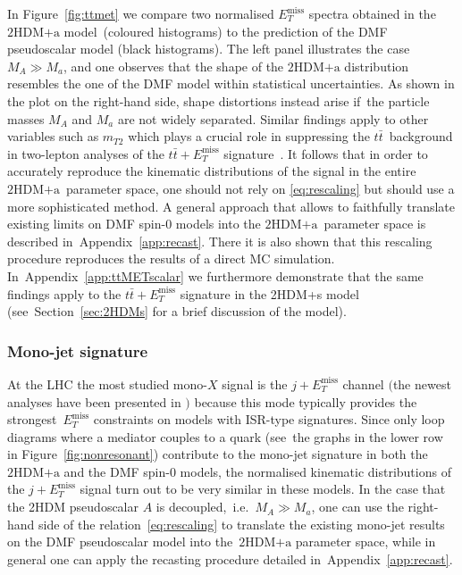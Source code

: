 \documentclass[a4paper, 11pt,notoc]{article}
\newcommand{\MET}{\ensuremath{E_T^\mathrm{miss}}\xspace}
\newcommand{\mA}{\ensuremath{M_{A}}\xspace}
\newcommand{\ma}{\ensuremath{M_{a}}\xspace}
\newcommand{\hdma}{\ensuremath{\textrm{2HDM+a}}\xspace}
\begin{document}
In Figure~\ref{fig:ttmet} we compare two normalised $\MET$ spectra obtained in the \hdma model~(coloured histograms) to the prediction of the DMF pseudoscalar   model (black histograms).  The left panel illustrates the case~$M_A \gg M_a$, and one observes that the shape of the \hdma distribution resembles  the one of the DMF model within statistical uncertainties. As shown in the plot on the right-hand side, shape distortions instead arise if~the particle masses $M_A$ and $M_a$ are not widely separated.  Similar findings apply to other variables such as $m_{T2}$ which  plays a crucial role in suppressing the $t \bar t$~background in two-lepton analyses of the $t \bar t + \MET$ signature~\cite{Aaboud:2017rzf,Haisch:2016gry,CMS-PAS-EXO-17-014}. It follows that in order to accurately reproduce the kinematic distributions of the signal in the entire \hdma~parameter space, one should not rely on \eqref{eq:rescaling} but should use a more sophisticated method. A general approach  that allows to faithfully translate existing limits on DMF spin-0   models into the \hdma~parameter space  is described in~Appendix~\ref{app:recast}. There it is also shown that this rescaling procedure reproduces the results of a direct MC simulation.  In~Appendix~\ref{app:ttMETscalar} we furthermore demonstrate that the same findings apply to the $t \bar t + \MET$ signature in the 2HDM+s model  (see~Section~\ref{sec:2HDMs} for a brief discussion of the model).

\subsubsection{Mono-jet signature}

At the LHC the most studied mono-$X$ signal is the $j +\MET$ channel $\big($the newest analyses have been presented in \cite{Aaboud:2017phn,Sirunyan:2017jix}$\big)$ because this mode typically provides the strongest~$\MET$ constraints on models with ISR-type  signatures. Since only loop diagrams where a mediator couples to a quark (see~the graphs in the lower row in Figure~\ref{fig:nonresonant}) contribute to the mono-jet signature in both the \hdma and the DMF spin-0 models, the normalised kinematic distributions of the $j +\MET$ signal turn out to be very similar in these models.  In the case that the 2HDM pseudoscalar $A$ is decoupled,~i.e.~$\mA \gg \ma$, one can use the right-hand side of the relation~\eqref{eq:rescaling} to translate the existing mono-jet results on the DMF pseudoscalar model into the~\hdma parameter space, while in general one can apply the recasting procedure detailed in~Appendix~\ref{app:recast}.
\end{document}
